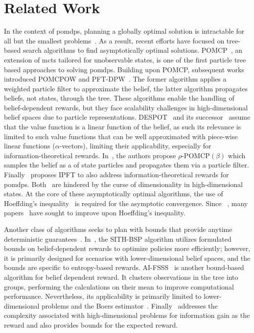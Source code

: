 \chapter{Related Work}

In the context of \glspl{pomdp}, planning a globally optimal solution is intractable for all but the smallest problems~\cite{Papadimitriou87math}. As a result, recent efforts have focused on tree-based search algorithms to find asymptotically optimal solutions. POMCP~\cite{Silver10nips}, an extension of \gls{mcts} tailored for unobservable states, is one of the first particle tree based approaches to solving \glspl{pomdp}. Building upon POMCP, subsequent works introduced POMCPOW and PFT-DPW~\cite{Sunberg18icaps}. The former algorithm applies a weighted particle filter to approximate the belief, the latter algorithm propagates beliefs, not states, through the tree. These algorithms enable the handling of belief-dependent rewards, but they face scalability challenges in high-dimensional belief spaces due to particle representations. DESPOT~\cite{Ye17jair} and its successor~\cite{Garg19rss} assume that the value function is a linear function of the belief, as such its relevance is limited to such value functions that can be well approximated with piece-wise linear functions ($\alpha$-vectors), limiting their applicability, especially for information-theoretical rewards. In~\cite{Thomas21arxiv}, the authors propose $\rho$-POMCP$(\beta)$ which samples the belief as a  of state particles and propagates them via a particle filter. Finally~\cite{Fischer20icml} proposes IPFT to also address information-theoretical rewards for \glspl{pomdp}. Both~\cite{Thomas21arxiv,Fischer20icml} are hindered by the curse of dimensionality in high-dimensional states. At the core of these asymptotically optimal algorithms, the use of Hoeffding's inequality~\cite{Hoeffding63jasa} is required for the asymptotic convergence. Since~\cite{Hoeffding63jasa} , many papers~\cite{Bentkus08lmj, From13jscs, Cohen15as} have sought to improve upon Hoeffding's inequality.

Another class of algorithms seeks to plan with bounds that provide anytime deterministic guarantees~\cite{Barenboim23nips}. In~\cite{Sztyglic22iros}, the SITH-BSP algorithm utilizes formulated bounds on belief-dependent rewards to optimize policies more efficiently; however, it is primarily designed for scenarios with lower-dimensional belief spaces, and the bounds are specific to entropy-based rewards. AI-FSSS~\cite{Barenboim22ijcai} is another bound-based algorithm for belief dependent reward. It clusters observations in the tree into groups, performing the calculations on their mean to improve computational performance. Nevertheless, its applicability is primarily limited to lower-dimensional problems and the Boers estimator~\cite{Boers10fusion}. Finally~\cite{Yotam24tro} addresses the complexity associated with high-dimensional problems for information gain as the reward and also provides bounds for the expected reward.

